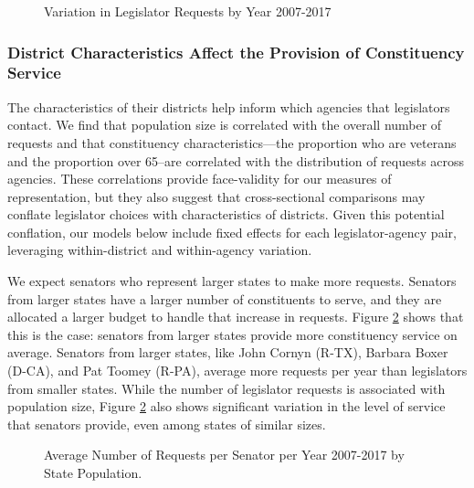 \documentclass[12pt]{article}
\begin{document}
\begin{figure}
\centering
\caption{Variation in Legislator Requests by Year 2007-2017} \label{f:peryear} 
\begin{minipage}{\textwidth}
\end{minipage}
\end{figure}



\subsubsection{District Characteristics Affect the Provision of Constituency Service }

The characteristics of their districts help inform which agencies that legislators contact. We find that population size is correlated with the overall number of requests and that constituency characteristics---the proportion who are veterans and the proportion over 65--are correlated with the distribution of requests across agencies. These correlations provide face-validity for our measures of representation, but they also suggest that cross-sectional comparisons may conflate legislator choices with characteristics of districts. Given this potential conflation, our models below include fixed effects for each legislator-agency pair, leveraging within-district and within-agency variation.  

We expect senators who represent larger states to make more requests. Senators from larger states have a larger number of constituents to serve, and they are allocated a larger budget to handle that increase in requests.
Figure \ref{f:stateSize} shows that this is the case: senators from larger states provide more constituency service on average. Senators from larger states, like John Cornyn (R-TX), Barbara Boxer (D-CA), and Pat Toomey (R-PA), average more requests per year than legislators from smaller states. While the number of legislator requests is associated with population size, Figure \ref{f:stateSize} also shows significant variation in the level of service that senators provide, even among states of similar sizes.  

\begin{figure}
\centering
\caption{Average Number of Requests per Senator per Year 2007-2017 by State Population.} \label{f:stateSize}
\end{figure}
\end{document}
